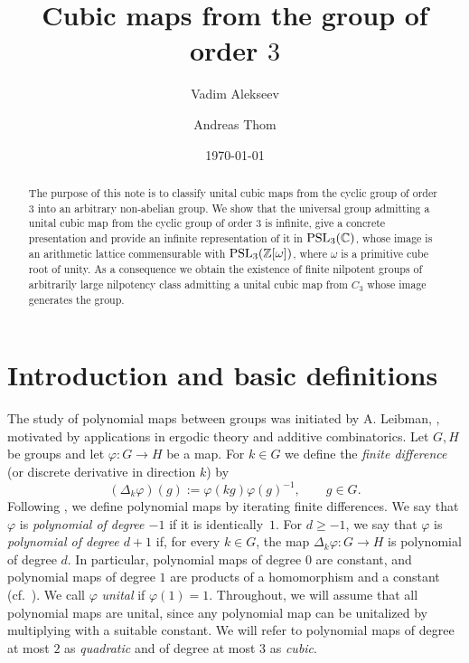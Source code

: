 \documentclass[11pt, a4paper]{amsproc}
\title{Cubic maps from the group of order $3$}
\author{Vadim Alekseev}
\author{Andreas Thom}
\date{\today}
\theoremstyle{remark}
\theoremstyle{plain}
\begin{document}
\begin{abstract}
The purpose of this note is to classify unital cubic maps from the cyclic group of order $3$ into an arbitrary non-abelian group. We show that the universal group admitting a unital cubic map from the cyclic group of order $3$ is infinite, give a concrete presentation and provide an infinite representation of it in ${\rm PSL}_3(\mathbb C)$, whose image is an arithmetic lattice commensurable with ${\rm PSL}_3(\mathbb Z[\omega])$, where $\omega$ is a primitive cube root of unity. As a consequence we obtain the existence of finite nilpotent groups of arbitrarily large nilpotency class admitting a unital cubic map from $C_3$ whose image generates the group.
\end{abstract}

\maketitle

\section*{Introduction and basic definitions}

The study of polynomial maps between groups was initiated by A. Leibman, \cite{MR1608723, MR1910931}, motivated by applications in ergodic theory and additive combinatorics. Let $G,H$ be groups and let $\varphi:G\to H$ be a map.
For $k\in G$ we define the \emph{finite difference} (or discrete derivative in direction $k$) by
\begin{equation}\label{eq:finite-difference}
    (\Delta_k\varphi)(g):=\varphi(kg)\varphi(g)^{-1},\qquad g\in G.
\end{equation}
Following \cite{MR1608723}, we define polynomial maps by iterating finite differences.
We say that $\varphi$ is \emph{polynomial of degree $-1$} if it is identically~$1$.
For $d\ge -1$, we say that $\varphi$ is \emph{polynomial of degree $d+1$} if, for every $k\in G$,
the map $\Delta_k\varphi:G\to H$ is polynomial of degree $d$.
In particular, polynomial maps of degree $0$ are constant, and polynomial maps of degree $1$
are products of a homomorphism and a constant (cf.\ \cite[Lemma~2.1]{AJ}).
We call $\varphi$ \emph{unital} if $\varphi(1)=1$. Throughout, we will assume that all polynomial maps are unital, since any polynomial map can be unitalized by multiplying with a suitable constant. We will refer to polynomial maps of degree at most $2$ as \emph{quadratic} and of degree at most $3$ as \emph{cubic}.
\end{document}
